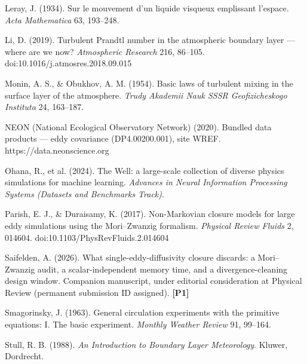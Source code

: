 \documentclass[11pt]{article}
\begin{document}
Leray, J. (1934). Sur le mouvement d'un liquide visqueux emplissant l'espace. \emph{Acta Mathematica} 63, 193--248.

Li, D. (2019). Turbulent Prandtl number in the atmospheric boundary layer --- where are we now? \emph{Atmospheric Research} 216, 86--105. doi:10.1016/j.atmosres.2018.09.015

Monin, A. S., \& Obukhov, A. M. (1954). Basic laws of turbulent mixing in the surface layer of the atmosphere. \emph{Trudy Akademii Nauk SSSR Geofizicheskogo Instituta} 24, 163--187.

NEON (National Ecological Observatory Network) (2020). Bundled data products --- eddy covariance (DP4.00200.001), site WREF. https://data.neonscience.org

Ohana, R., et al. (2024). The Well: a large-scale collection of diverse physics simulations for machine learning. \emph{Advances in Neural Information Processing Systems (Datasets and Benchmarks Track)}.

Parish, E. J., \& Duraisamy, K. (2017). Non-Markovian closure models for large eddy simulations using the Mori--Zwanzig formalism. \emph{Physical Review Fluids} 2, 014604. doi:10.1103/PhysRevFluids.2.014604

Saifelden, A. (2026). What single-eddy-diffusivity closure discards: a Mori--Zwanzig audit, a scalar-independent memory time, and a divergence-cleaning design window. Companion manuscript, under editorial consideration at Physical Review (permanent submission ID assigned). \textbf{[P1]}

Smagorinsky, J. (1963). General circulation experiments with the primitive equations: I. The basic experiment. \emph{Monthly Weather Review} 91, 99--164.

Stull, R. B. (1988). \emph{An Introduction to Boundary Layer Meteorology}. Kluwer, Dordrecht.
\end{document}
